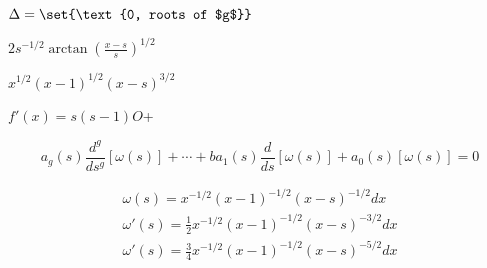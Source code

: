 $\Delta = \set{\text{0, roots of $g$}}$


$2s^{-1/2}\arctan\left(\frac{x-s}{s}\right)^{1/2}$


$x^{1/2}(x-1)^{1/2}(x-s)^{3/2}$


$f'(x) = s(s-1) O$+


\begin{equation*}
a_g(s) \frac{ d^g  }{ds^g}[\omega(s)] + \cdots +
ba_1(s) \frac{ d  }{ds}[\omega(s)] +
a_0(s) [\omega(s)]  = 0
\end{equation*}

\begin{equation*}
\begin{split}
\omega(s) = x^{-1/2}(x-1)^{-1/2}(x-s)^{-1/2} dx \\
\omega'(s) = \frac{1}{2} x^{-1/2}(x-1)^{-1/2}(x-s)^{-3/2} dx \\
\omega'(s) = \frac{3}{4} x^{-1/2}(x-1)^{-1/2}(x-s)^{-5/2} dx
\end{split}
\end{equation*}

